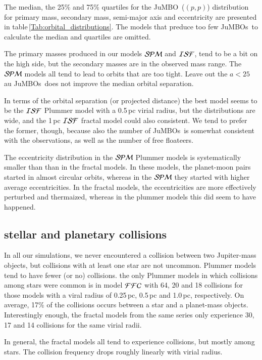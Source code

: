 \documentclass[submission,phys]{lib/SciPost}
\newcommand{\jumbo}{\mbox{JuMBO}}
\newcommand{\jumbos}{\mbox{JuMBOs}}
\begin{document}
The median, the 25\% and 75\% quartiles for the \jumbo\, ($(p,p)$)
distribution for primary mass, secondary mass, semi-major axis and
eccentricity are presented in table\,\ref{Tab:orbital_distributions}.
The models that preduce too few \jumbos\, to calculate the median and
quartiles are omitted.

The primary masses produced in our models ${\cal SPM}$ and ${\cal
  ISF}$, tend to be a bit on the high side, but the secondary masses
are in the observed mass range.  The ${\cal SPM}$ models all tend to
lead to orbits that are too tight. Leave out the $a<25$\,au \jumbos\,
does not improve the median orbital separation.

In terms of the orbital separation (or projected distance) the best
model seems to be the ${\cal ISF}$ Plummer model with a 0.5\,pc virial
radius, but the distributions are wide, and the 1\,pc ${\cal ISF}$
fractal model could also consistent.  We tend to prefer the former,
though, because also the number of \jumbos\, is somewhat consistent
with the observations, as well as the number of free floateers.

The eccentricity distribution in the ${\cal SPM}$ Plummer models is
systematically smaller than than in the fractal models.  In these
models, the planet-moon pairs started in almost circular orbits,
whereas in the ${\cal SPM}$ they started with higher average
eccentricities.  In the fractal models, the eccentricities are more
effectively perturbed and thermaized, whereas in the plummer models
this did seem to have happened.


\subsection{stellar and planetary collisions}

In all our simulations, we never encountered a collision between two
Jupiter-mass objects, but collisions with at least one star are not
uncommon. Plummer models tend to have fewer (or no) collisions.  the
only Plummer models in which collisions among stars were common is in
model ${\cal FFC}$ with 64, 20 and 18 collisions for those models with
a viral radius of 0.25\,pc, 0.5\,pc and 1.0\,pc, respectively.  On
average, 17\% of the collisions occurs between a star and a
planet-mass objects. Interestingly enough, the fractal models from the
same series only experience 30, 17 and 14 collisions for the same
virial radii.

In general, the fractal models all tend to experience collisions, but
mostly among stars. The collision frequency drops roughly linearly
with virial radius.
\end{document}

